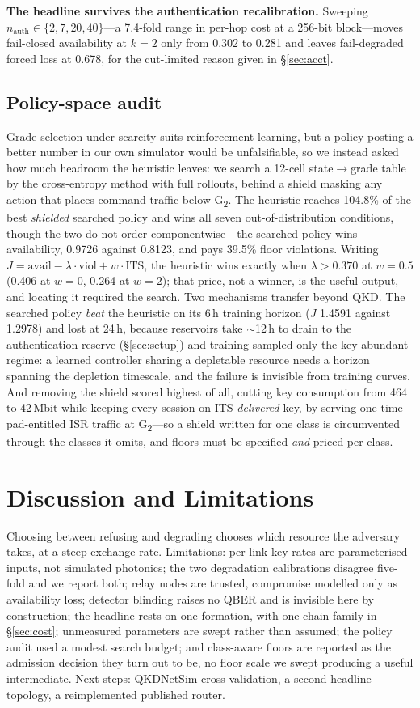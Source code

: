 \documentclass[conference]{IEEEtran}
\newcommand{\GII}{G\textsubscript{2}}
\begin{document}
\textbf{The headline survives the authentication recalibration.} Sweeping
$n_{\mathrm{auth}} \in \{2,7,20,40\}$---a 7.4-fold range in per-hop cost at a
256-bit block---moves fail-closed availability at $k=2$ only from 0.302 to 0.281
and leaves fail-degraded forced loss at 0.678, for the cut-limited reason given in
\S\ref{sec:acct}.

\subsection{Policy-space audit}\label{sec:audit}
Grade selection under scarcity suits reinforcement learning, but a policy posting a
better number in our own simulator would be unfalsifiable, so we instead asked how
much headroom the heuristic leaves: we search a 12-cell state$\rightarrow$grade table
by the cross-entropy method with full rollouts, behind a shield masking any action
that places command traffic below \GII. The heuristic reaches 104.8\% of the best
\emph{shielded} searched policy and wins all seven out-of-distribution conditions,
though the two do not order componentwise---the searched policy wins availability,
0.9726 against 0.8123, and pays 39.5\% floor violations. Writing
$J=\text{avail}-\lambda\cdot\text{viol}+w\cdot\text{ITS}$, the heuristic wins exactly
when $\lambda>0.370$ at $w=0.5$ (0.406 at $w=0$, 0.264 at $w=2$); that price, not a
winner, is the useful output, and locating it required the search. Two mechanisms
transfer beyond QKD. The searched policy \emph{beat} the heuristic on its 6\,h
training horizon ($J$ 1.4591 against 1.2978) and lost at 24\,h, because reservoirs
take $\sim$12\,h to drain to the authentication reserve (\S\ref{sec:setup}) and
training sampled only the key-abundant regime: a learned controller sharing a
depletable resource needs a horizon spanning the depletion timescale, and the failure
is invisible from training curves. And removing the shield scored highest of all,
cutting key consumption from 464 to 42\,Mbit while keeping every session on
ITS-\emph{delivered} key, by serving one-time-pad-entitled ISR traffic at \GII---so a
shield written for one class is circumvented through the classes it omits, and floors
must be specified \emph{and} priced per class.

\section{Discussion and Limitations}
Choosing between refusing and degrading chooses which resource the adversary takes,
at a steep exchange rate. Limitations: per-link key rates are parameterised inputs,
not simulated photonics; the two degradation calibrations disagree five-fold and we
report both; relay nodes are trusted, compromise modelled only as availability loss;
detector blinding raises no QBER and is invisible here by construction; the headline
rests on one formation, with one chain family in \S\ref{sec:cost}; unmeasured
parameters are swept rather than assumed; the policy audit used a modest search
budget; and class-aware floors are reported as the admission decision they turn out
to be, no floor scale we swept producing a useful intermediate. Next steps:
QKDNetSim cross-validation, a second headline topology, a reimplemented published
router.
\end{document}
